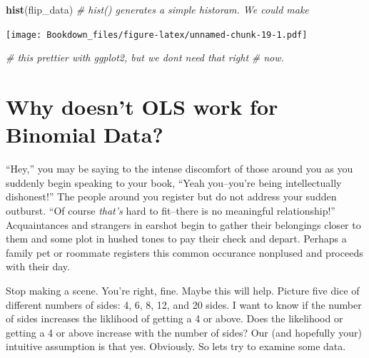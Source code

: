 \documentclass[
]{book}
\newenvironment{Shaded}{\begin{snugshade}}{\end{snugshade}}
\newcommand{\CommentTok}[1]{\textcolor[rgb]{0.56,0.35,0.01}{\textit{#1}}}
\newcommand{\KeywordTok}[1]{\textcolor[rgb]{0.13,0.29,0.53}{\textbf{#1}}}
\newcommand{\NormalTok}[1]{#1}
\begin{document}
\begin{Shaded}
\begin{Highlighting}[]
\KeywordTok{hist}\NormalTok{(flip\_data)         }\CommentTok{\# hist() generates a simple historam. We could make}
\end{Highlighting}
\end{Shaded}

\texttt{[image: Bookdown\_files/figure-latex/unnamed-chunk-19-1.pdf]}

\begin{Shaded}
\begin{Highlighting}[]
                        \CommentTok{\# this prettier with ggplot2, but we don\textquotesingle{}t need that right}
                        \CommentTok{\# now.}
\end{Highlighting}
\end{Shaded}

\hypertarget{why-doesnt-ols-work-for-binomial-data}{%
\section{Why doesn't OLS work for Binomial Data?}\label{why-doesnt-ols-work-for-binomial-data}}

``Hey,'' you may be saying to the intense discomfort of those around you as you suddenly begin speaking to your book, ``Yeah you--you're being intellectually dishonest!'' The people around you register but do not address your sudden outburst. ``Of course \emph{that's} hard to fit--there is no meaningful relationship!'' Acquaintances and strangers in earshot begin to gather their belongings closer to them and some plot in hushed tones to pay their check and depart. Perhaps a family pet or roommate registers this common occurance nonplused and proceeds with their day.

Stop making a scene. You're right, fine. Maybe this will help. Picture five dice of different numbers of sides: 4, 6, 8, 12, and 20 sides. I want to know if the number of sides increases the liklihood of getting a 4 or above. Does the likelihood or getting a 4 or above increase with the number of sides? Our (and hopefully your) intuitive assumption is that yes. Obviously. So lets try to examine some data.
\end{document}
